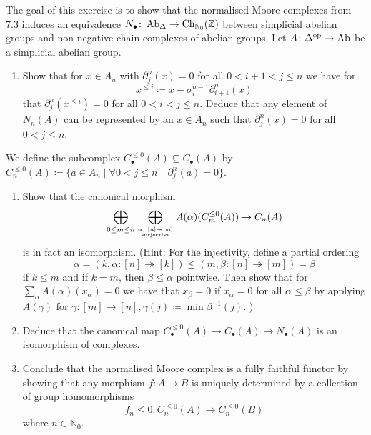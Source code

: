 \begin{Exercise}
	The goal of this exercise is to show that the normalised Moore complexes from 7.3 induces an equivalence $ N_{ \bullet } \colon \operatorname{Ab}_{ \Delta } \to \operatorname{Ch}_{ \mathbb{ N }_0 } ( \mathbb{ Z } ) $ between simplicial abelian groups and non-negative chain complexes of abelian groups. 
	Let $ A \colon \Delta^{ \operatorname{op} } \to \operatorname{Ab} $ be a simplicial abelian group.  
	\begin{enumerate}[label=(\alph*)]
		\item 
		Show that for $ x \in A_n $ with $ \partial_j^n ( x ) = 0 $ for all $ 0 < i + 1 < j \leq n $ we have for 
		\[
		x^{ \leq i } \coloneqq x - \sigma_i^{ n - 1 } \partial_{ i + 1 }^n ( x ) 
		\]
		that $ \partial_j^n ( x^{ \leq i } ) = 0 $ for all $ 0 < i < j \leq n $.
		Deduce that any element of $ N_n ( A ) $ can be represented by an $ x \in A_n $ such that $ \partial^n_j ( x ) = 0 $ for all $ 0 < j \leq n $.
	\end{enumerate}
	
	We define the subcomplex $ C_{ \bullet }^{ \leq 0 } ( A ) \subseteq C_{ \bullet } ( A ) $ by $ C_n^{ \leq 0 } ( A ) \coloneqq \{ a \in A_n \mid \forall 0 < j \leq n \quad \partial_j^n ( a ) = 0 \} $.
	
	\begin{enumerate}[resume, label=(\alph*)]
		\item 
		Show that the canonical morphism 
		\[
		\bigoplus_{ 0 \leq m \leq n } \bigoplus_{ \alpha \colon [ n ] \twoheadrightarrow [ m ] \atop \text{ surjective } }
		A ( \alpha ) ( C_m^{ \leq 0 } ( A ) ) \to C_n ( A )
		\]
		is in fact an isomorphism.
		(Hint: For the injectivity, define a partial ordering 
		\[
		\alpha = ( k , \alpha \colon [ n ] \twoheadrightarrow [ k ] ) \leq 
		( m , \beta \colon [ n ] \twoheadrightarrow [ m ] ) = \beta
		\]
		if $ k \leq m $ and if $ k = m $, then $ \beta \leq \alpha $ pointwise.
		Then show that for $ \sum_\alpha A ( \alpha ) ( x_\alpha ) = 0 $ we have that 
		$ x_\beta = 0 $ if $ x_{ \alpha } = 0 $ for all $ \alpha \leq \beta $ by applying $ A ( \gamma ) $ for $ \gamma \colon [ m ] \to [ n ] , \gamma ( j ) \coloneqq \min \beta^{ - 1 } ( j ) . $ )
		
		\item 
		Deduce that the canonical map $ C_{ \bullet }^{ \leq 0 } ( A ) \to C_{ \bullet } ( A ) \to N_{ \bullet } ( A ) $ is an isomorphism of complexes.
		
		\item 
		Conclude that the normalised Moore complex is a fully faithful functor by showing that any morphism $ f \colon A \to B $ is uniquely determined by a collection of group homomorphisms 
		\[
		f_n{ \leq 0 } \colon C_n^{ \leq 0 } ( A ) \to C_n^{ \leq 0 } ( B ) 
		\]
		where $ n \in \mathbb{ N }_0 $.
	\end{enumerate}
	

\end{Exercise}

